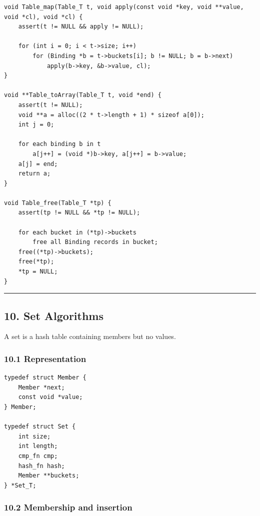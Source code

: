 \documentclass[11pt]{article}
\begin{document}
\begin{verbatim}
void Table_map(Table_T t, void apply(const void *key, void **value, void *cl), void *cl) {
    assert(t != NULL && apply != NULL);

    for (int i = 0; i < t->size; i++)
        for (Binding *b = t->buckets[i]; b != NULL; b = b->next)
            apply(b->key, &b->value, cl);
}

void **Table_toArray(Table_T t, void *end) {
    assert(t != NULL);
    void **a = alloc((2 * t->length + 1) * sizeof a[0]);
    int j = 0;

    for each binding b in t
        a[j++] = (void *)b->key, a[j++] = b->value;
    a[j] = end;
    return a;
}

void Table_free(Table_T *tp) {
    assert(tp != NULL && *tp != NULL);

    for each bucket in (*tp)->buckets
        free all Binding records in bucket;
    free((*tp)->buckets);
    free(*tp);
    *tp = NULL;
}
\end{verbatim}

\begin{center}\rule{0.5\linewidth}{0.5pt}\end{center}

\subsection{10. Set Algorithms}\label{set-algorithms}

A set is a hash table containing members but no values.

\subsubsection{10.1 Representation}\label{representation-2}

\begin{verbatim}
typedef struct Member {
    Member *next;
    const void *value;
} Member;

typedef struct Set {
    int size;
    int length;
    cmp_fn cmp;
    hash_fn hash;
    Member **buckets;
} *Set_T;
\end{verbatim}

\subsubsection{10.2 Membership and insertion}\label{membership-and-insertion}
\end{document}
